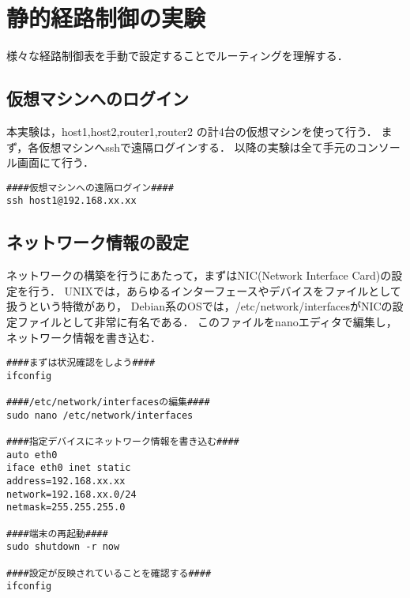 \section{静的経路制御の実験}
様々な経路制御表を手動で設定することでルーティングを理解する．

\subsection{仮想マシンへのログイン}
本実験は，host1,host2,router1,router2 の計4台の仮想マシンを使って行う．
まず，各仮想マシンへsshで遠隔ログインする．
以降の実験は全て手元のコンソール画面にて行う．
\begin{shadebox}
\begin{verbatim}
####仮想マシンへの遠隔ログイン####
ssh host1@192.168.xx.xx

\end{verbatim}
\end{shadebox}
\vspace{4mm}

\subsection{ネットワーク情報の設定}
ネットワークの構築を行うにあたって，まずはNIC(Network Interface Card)の設定を行う．
UNIXでは，あらゆるインターフェースやデバイスをファイルとして扱うという特徴があり，
Debian系のOSでは，/etc/network/interfacesがNICの設定ファイルとして非常に有名である．
このファイルをnanoエディタで編集し，ネットワーク情報を書き込む．
\begin{shadebox}
\begin{verbatim}
####まずは状況確認をしよう####
ifconfig

####/etc/network/interfacesの編集####
sudo nano /etc/network/interfaces

####指定デバイスにネットワーク情報を書き込む####
auto eth0
iface eth0 inet static
address=192.168.xx.xx
network=192.168.xx.0/24
netmask=255.255.255.0

####端末の再起動####
sudo shutdown -r now

####設定が反映されていることを確認する####
ifconfig

\end{verbatim}
\end{shadebox}
\vspace{4mm}

